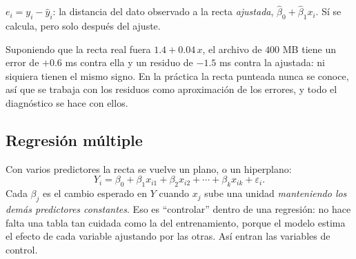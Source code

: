 \documentclass[11pt,letterpaper]{article}
\begin{document}
\begin{definicion}[Residuo]
    $e_i = y_i - \hat{y}_i$: la distancia del dato observado a la recta
    \emph{ajustada}, $\hat{\beta}_0 + \hat{\beta}_1 x_i$. Sí se
    calcula, pero solo después del ajuste.
\end{definicion}

\begin{center}
\end{center}

Suponiendo que la recta real fuera $1.4 + 0.04\,x$, el archivo de
$400$ MB tiene un error de $+0.6$ ms contra ella y un residuo de
$-1.5$ ms contra la ajustada: ni siquiera tienen el mismo signo. En la
práctica la recta punteada nunca se conoce, así que se trabaja con los
residuos como aproximación de los errores, y todo el diagnóstico se
hace con ellos.


\subsection*{Regresión múltiple}

Con varios predictores la recta se vuelve un plano, o un hiperplano:
\[
    Y_i = \beta_0 + \beta_1 x_{i1} + \beta_2 x_{i2} + \cdots
          + \beta_k x_{ik} + \varepsilon_i .
\]
Cada $\beta_j$ es el cambio esperado en $Y$ cuando $x_j$ sube una
unidad \emph{manteniendo los demás predictores constantes}. Eso es
``controlar'' dentro de una regresión: no hace falta una tabla tan
cuidada como la del entrenamiento, porque el modelo estima el efecto de
cada variable ajustando por las otras. Así entran las variables de
control.
\end{document}
